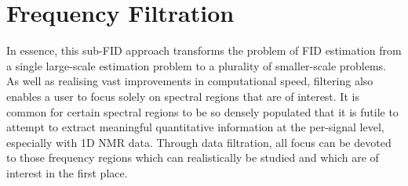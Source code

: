 \section{Frequency Filtration}
\label{sec:filtering}
\label{corr:estimation-time}
In essence, this sub-\ac{FID} approach transforms the problem of \ac{FID}
estimation from a
single large-scale estimation problem to a plurality of smaller-scale problems.
As well as realising vast improvements in computational speed, filtering also
enables a user to focus solely on spectral regions that are of interest.
It is common for certain spectral regions to be so densely populated
that it is futile to attempt to extract meaningful quantitative information at
the per-signal level, especially with \ac{1D} \ac{NMR} data.
Through data filtration, all focus can be devoted to those frequency regions
which can realistically be studied and which are of interest in the first
place.


